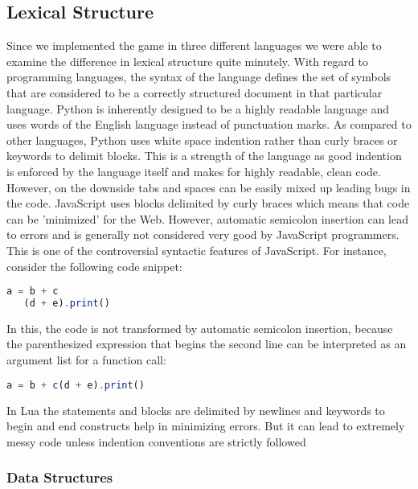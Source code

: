 \subsection{Lexical Structure}
Since we implemented the game in three different languages we were able to examine the difference in lexical structure quite minutely. With regard to programming languages, the syntax of the language defines the set of symbols that are considered to be a correctly structured document in that particular language. Python is inherently designed to be a highly readable language and uses words of the English language instead of punctuation marks. As compared to other languages, Python uses white space indention rather than curly braces or keywords to delimit blocks. This is a strength of the language as good indention is enforced by the language itself and makes for highly readable, clean code. However, on the downside tabs and spaces can be easily mixed up leading bugs in the code. 
JavaScript uses blocks delimited by curly braces which means that code can be 'minimized' for the Web. However, automatic semicolon insertion  can lead to errors and is generally not considered very good by JavaScript programmers. This is one of the controversial syntactic features of JavaScript. For instance, consider the following code snippet:
\begin{lstlisting}[language={JavaScript}, %
  title={}, label=semicolon]
	a = b + c
   (d + e).print()
\end{lstlisting}

In this, the code is not transformed by automatic semicolon insertion, because the parenthesized expression that begins the second line can be interpreted as an argument list for a function call:

\begin{lstlisting}[language={JavaScript}, %
  title={}, label=semicolon]
	a = b + c(d + e).print()
\end{lstlisting}

In Lua the statements and blocks are delimited by newlines and keywords to begin and end constructs help in minimizing errors. But it can lead to extremely messy code unless indention conventions are strictly followed


\subsubsection{Data Structures}

